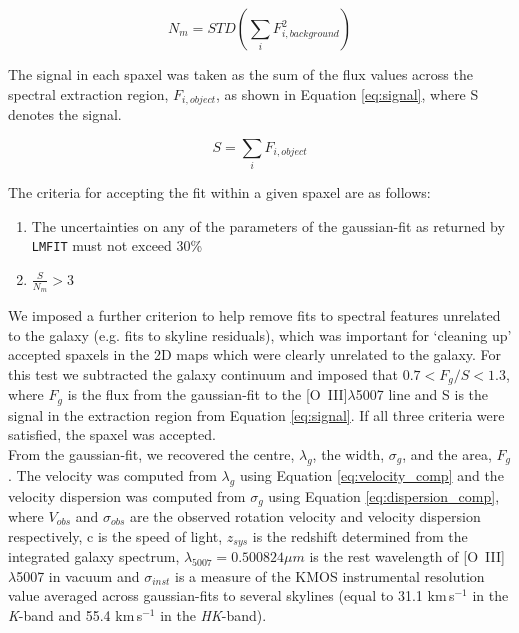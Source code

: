 \documentclass[fleqn,usenatbib]{mnras}
\begin{document}
\begin{equation}\label{eq:noise}
    N_{m} = STD\left(\sum_{i}F_{i,background}^{2}\right)
\end{equation}

\noindent
The signal in each spaxel was taken as the sum of the flux values across the spectral extraction region, $F_{i,object}$, as shown in Equation \ref{eq:signal}, where S denotes the signal.

\begin{equation}\label{eq:signal}
    S = \sum_{i}F_{i,object}
\end{equation}

\noindent
The criteria for accepting the fit within a given spaxel are as follows:

\begin{enumerate}[label=(\roman*),align=left]
\item The uncertainties on any of the parameters of the gaussian-fit as returned by {\tt LMFIT} must not exceed 30\%
\item $\frac{S}{N_{m}} > 3$
\end{enumerate}

\noindent
We imposed a further criterion to help remove fits to spectral features unrelated to the galaxy (e.g. fits to skyline residuals), which was important for `cleaning up' accepted spaxels in the 2D maps which were clearly unrelated to the galaxy. For this test we subtracted the galaxy continuum and imposed that $0.7 < F_{g}/{S} < 1.3$, where $F_{g}$ is the flux from the gaussian-fit to the [O~{\sc III}]$\lambda$5007 line and S is the signal in the extraction region from Equation \ref{eq:signal}. If all three criteria were satisfied, the spaxel was accepted. \\

\noindent
From the gaussian-fit, we recovered the centre, $\lambda_{g}$, the width, $\sigma_{g}$, and the area, $F_{g}$.
The velocity was computed from $\lambda_{g}$ using Equation \ref{eq:velocity_comp} and the velocity dispersion was computed from $\sigma_{g}$ using Equation \ref{eq:dispersion_comp}, where $V_{obs}$ and $\sigma_{obs}$ are the observed rotation velocity and velocity dispersion respectively, c is the speed of light, $z_{sys}$ is the redshift determined from the integrated galaxy spectrum, $\lambda_{5007} = 0.500824\mu m$ is the rest wavelength of [O~{\sc III}]$\lambda$5007 in vacuum and $\sigma_{inst}$ is a measure of the KMOS instrumental resolution value averaged across gaussian-fits to several skylines (equal to 31.1 km\,s$^{-1}$ in the {\it K}-band and 55.4 km\,s$^{-1}$ in the {\it HK}-band).
\end{document}
